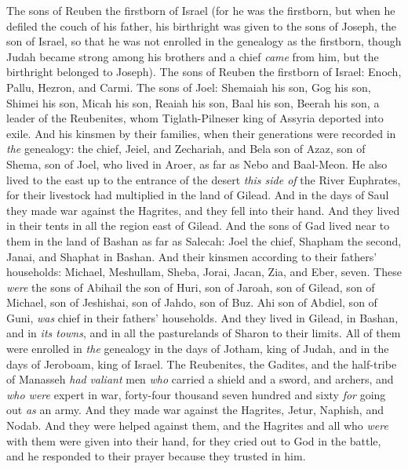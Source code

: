 \begin{biblechapter} %
 The sons of Reuben the firstborn of Israel (for he was the firstborn, but when he defiled the couch of his father, his birthright was given to the sons of Joseph, the son of Israel, so that he was not enrolled in the genealogy as the firstborn,
\verse though Judah became strong among his brothers and a chief \textit{came} from him, but the birthright belonged to Joseph).
\verse The sons of Reuben the firstborn of Israel: Enoch, Pallu, Hezron, and Carmi.
\verse The sons of Joel: Shemaiah his son, Gog his son, Shimei his son,
\verse Micah his son, Reaiah his son, Baal his son,
\verse Beerah his son, a leader of the Reubenites, whom Tiglath-Pilneser king of Assyria deported into exile.
\verse And his kinsmen by their families, when their generations were recorded in \textit{the} genealogy: the chief, Jeiel, and Zechariah,
\verse and Bela son of Azaz, son of Shema, son of Joel, who lived in Aroer, as far as Nebo and Baal-Meon.
\verse He also lived to the east up to the entrance of the desert \textit{this side of} the River Euphrates, for their livestock had multiplied in the land of Gilead.
\verse And in the days of Saul they made war against the Hagrites, and they fell into their hand. And they lived in their tents in all the region east of Gilead.
 And the sons of Gad lived near to them in the land of Bashan as far as Salecah:
\verse Joel the chief, Shapham the second, Janai, and Shaphat in Bashan.
\verse And their kinsmen according to their fathers’ households: Michael, Meshullam, Sheba, Jorai, Jacan, Zia, and Eber, seven.
\verse These \textit{were} the sons of Abihail the son of Huri, son of Jaroah, son of Gilead, son of Michael, son of Jeshishai, son of Jahdo, son of Buz.
\verse Ahi son of Abdiel, son of Guni, \textit{was} chief in their fathers’ households.
\verse And they lived in Gilead, in Bashan, and in \textit{its towns}, and in all the pasturelands of Sharon to their limits.
\verse All of them were enrolled in \textit{the} genealogy in the days of Jotham, king of Judah, and in the days of Jeroboam, king of Israel.
\verse The Reubenites, the Gadites, and the half-tribe of Manasseh \textit{had} \textit{valiant} men \textit{who} carried a shield and a sword, and archers, and \textit{who were} expert in war, forty-four thousand seven hundred and sixty \textit{for} going out \textit{as} an army.
\verse And they made war against the Hagrites, Jetur, Naphish, and Nodab.
\verse And they were helped against them, and the Hagrites and all who \textit{were} with them were given into their hand, for they cried out to God in the battle, and he responded to their prayer because they trusted in him.

\end{biblechapter}
